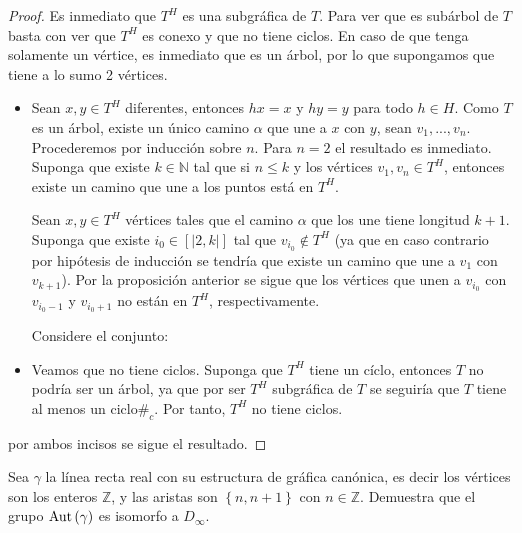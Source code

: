 \documentclass[12pt]{report}
\newcounter{it}
\theoremstyle{largebreak}
\newcommand\contradiction{\ensuremath{\#_c}}
\newcommand\natint[1]{\ensuremath{\left[\big|#1\big|\right]}}
\newcommand{\Aut}[1]{\ensuremath{\textup{Aut}\left(#1\right)}}
\begin{document}
    \begin{proof}
        Es inmediato que $T^H$ es una subgráfica de $T$. Para ver que es subárbol de $T$ basta con ver que $T^H$ es conexo y que no tiene ciclos. En caso de que tenga solamente un vértice, es inmediato que es un árbol, por lo que supongamos que tiene a lo sumo 2 vértices.
        \begin{itemize}
            \item Sean $x,y\in T^H$ diferentes, entonces $hx=x$ y $hy=y$ para todo $h\in H$. Como $T$ es un árbol, existe un único camino $\alpha$ que une a $x$ con $y$, sean $v_1,...,v_n$. Procederemos por inducción sobre $n$. Para $n=2$ el resultado es inmediato. Suponga que existe $k\in\mathbb{N}$ tal que si $n\leq k$ y los vértices $v_1,v_n\in T^H$, entonces existe un camino que une a los puntos está en $T^H$.
            
            Sean $x,y\in T^H$ vértices tales que el camino $\alpha$ que los une tiene longitud $k+1$. Suponga que existe $i_0\in\natint{2,k}$ tal que $v_{ i_0}\notin T^H$ (ya que en caso contrario por hipótesis de inducción se tendría que existe un camino que une a $v_1$ con $v_{k+1}$). Por la proposición anterior se sigue que los vértices que unen a $v_{i_0}$ con $v_{i_0-1}$ y $v_{i_0+1}$ no están en $T^H$, respectivamente.

            Considere el conjunto:

            \item Veamos que no tiene ciclos. Suponga que $T^H$ tiene un cíclo, entonces $T$ no podría ser un árbol, ya que por ser $T^H$ subgráfica de $T$ se seguiría que $T$ tiene al menos un ciclo\contradiction. Por tanto, $T^H$ no tiene ciclos.
        \end{itemize}
        por ambos incisos se sigue el resultado.
    \end{proof}

    \begin{excer}
        Sea $\gamma$ la línea recta real con su estructura de gráfica canónica, es decir los vértices son los enteros $\mathbb{Z}$, y las aristas son $\left\{n,n+1\right\}$ con $n\in\mathbb{Z}$. Demuestra que el grupo $\Aut{\gamma}$ es isomorfo a $D_\infty$.
    \end{excer}
\end{document}
